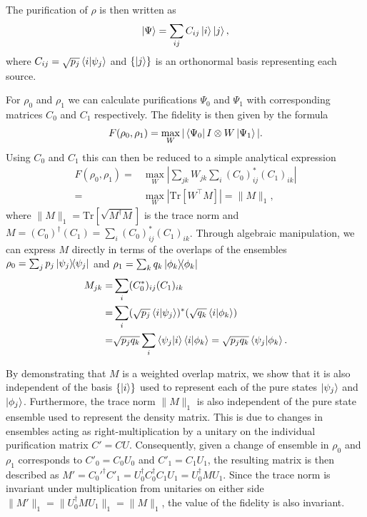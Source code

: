 \documentclass[reprint,amsmath,amssymb,aps,prl,floatfix,groupedaddress,superscriptaddress]{revtex4-2}
\begin{document}
The purification of $\rho$ is then written as
\begin{equation}
\ket{\Psi} = \sum_{ij} C_{ij} \ket{i} \ket{j},
\end{equation}
where $C_{ij} = \sqrt{p_j} \braket{i}{\psi_j}$ and $\{\ket{j}\}$ is an orthonormal basis representing each source.

For $\rho_0$ and $\rho_1$ we can calculate purifications $\Psi_0$ and $\Psi_1$ with corresponding matrices $C_0$ and $C_1$ respectively. The fidelity is then given by the formula
\begin{equation}
F(\rho_0, \rho_1) = \max_W |\bra{\Psi_0} I \otimes W \ket{\Psi_1}|.
\end{equation}
Using $C_0$ and $C_1$ this can then be reduced to a simple analytical expression
\begin{equation}
\begin{aligned}
F(\rho_0, \rho_1) =& \max_W \left| \sum_{jk} W_{jk} \sum_{i} (C_0)^*_{ij} (C_1)_{ik} \right| \\
=& \max_W \left| \text{Tr}[W^\top M] \right| = \|M\|_1,
\end{aligned}
\end{equation}
where $\|M\|_1 = \text{Tr}[\sqrt{M^\dagger M}]$ is the trace norm and $M = (C_0)^\dagger (C_1) = \sum_i (C_0)^*_{ij} (C_1)_{ik}$.
Through algebraic manipulation, we can express $M$ directly in terms of the overlaps of the ensembles $\rho_0 = \sum_j p_j \ketbra{\psi_j}{\psi_j}$ and $\rho_1  = \sum_k q_k \ketbra{\phi_k}{\phi_k}$
\begin{equation}
\begin{aligned}
M_{jk} =& \sum_i (C_0^*)_{ij} (C_1)_{ik}\\
= & \sum_{i} (\sqrt{p_j}\braket{i}{\psi_j})^*(\sqrt{q_k} \braket{i}{\phi_k})\\
= & \sqrt{p_j q_k} \sum_i \braket{\psi_j}{i} \braket{i}{\phi_k} = \sqrt{p_j q_k} \braket{\psi_j}{\phi_k}.
\end{aligned}
\end{equation}

By demonstrating that $M$ is a weighted overlap matrix, we show that it is also independent of the basis $\{\ket{i}\}$ used to represent each of the pure states $\ket{\psi_j}$ and $\ket{\phi_j}$.
Furthermore, the trace norm $\|M\|_1$ is also independent of the pure state ensemble used to represent the density matrix. This is due to changes in ensembles acting as right-multiplication by a unitary on the individual purification matrix $C' = CU$. Consequently, given a change of ensemble in $\rho_0$ and $\rho_1$ corresponds to $C'_0 = C_0U_0$ and $C'_1 = C_1U_1$, the resulting matrix is then described as  $M' = C_0'^\dagger C'_1 = U_0^\dagger C_0^\dagger C_1 U_1 = U_0^\dagger MU_1$. Since the trace norm is invariant under multiplication from unitaries on either side $\|M'\|_1 = \|U_0^\dagger M U_1 \|_1 = \|M\|_1$, the value of the fidelity is also invariant.
\end{document}
